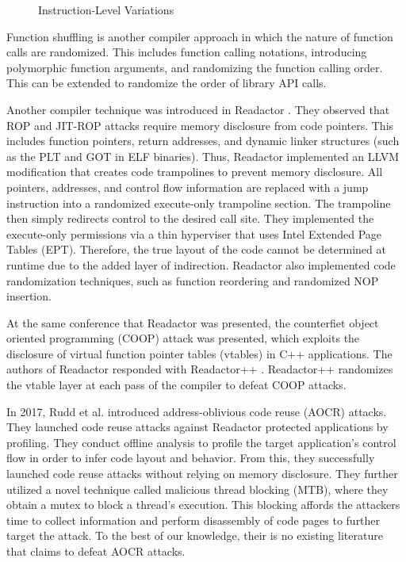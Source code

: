 \documentclass[preprint,12pt]{elsarticle}
\begin{document}
\begin{figure}[ht]
\centering{}
\caption{Instruction-Level Variations}
\label{fig:instructions}
\end{figure}

Function shuffling is another compiler approach in which the nature of function calls are randomized. This includes function calling notations, introducing polymorphic function arguments, and randomizing the function calling order. This can be extended to randomize the order of library API calls.

Another compiler technique was introduced in Readactor \cite{crane2015readactor}. They observed that ROP and JIT-ROP \cite{snow2013just} attacks require memory disclosure from code pointers. This includes function pointers, return addresses, and dynamic linker structures (such as the PLT and GOT in ELF binaries). Thus, Readactor implemented an LLVM modification that creates code trampolines to prevent memory disclosure. All pointers, addresses, and control flow information are replaced with a jump instruction into a randomized execute-only trampoline section. The trampoline then simply redirects control to the desired call site. They implemented the execute-only permissions via a thin hyperviser that uses Intel Extended Page Tables (EPT). Therefore, the true layout of the code cannot be determined at runtime due to the added layer of indirection. Readactor also implemented code randomization techniques, such as function reordering and randomized NOP insertion.

At the same conference that Readactor was presented, the counterfiet object oriented programming (COOP) attack \cite{schuster2015counterfeit} was presented, which exploits the disclosure of virtual function pointer tables (vtables) in C++ applications. The authors of Readactor responded with Readactor++ \cite{crane2015s}. Readactor++ randomizes the vtable layer at each pass of the compiler to defeat COOP attacks. 

In 2017, Rudd et al. \cite{rudd2017address} introduced address-oblivious code reuse (AOCR) attacks. They launched code reuse attacks against Readactor protected applications by profiling. They conduct offline analysis to profile the target application's control flow in order to infer code layout and behavior. From this, they successfully launched code reuse attacks without relying on memory disclosure. They further utilized a novel technique called malicious thread blocking (MTB), where they obtain a mutex to block a thread's execution. This blocking affords the attackers time to collect information and perform disassembly of code pages to further target the attack. To the best of our knowledge, their is no existing literature that claims to defeat AOCR attacks.
\end{document}
